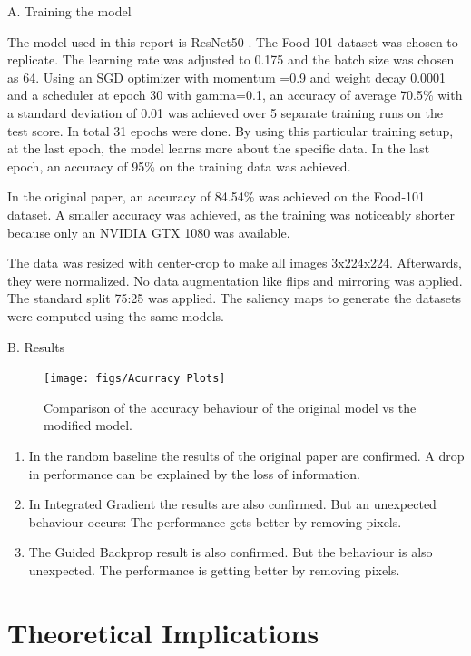 A. Training the model

The model used in this report is ResNet50 \cite{he2015deep}. The Food-101 \cite{bossard14} dataset was chosen to replicate. The learning rate was adjusted to 0.175 and the batch size was chosen as 64. Using an SGD optimizer with momentum =0.9 and weight decay 0.0001 and a scheduler at epoch 30 with gamma=0.1, an accuracy of average 70.5\% with a standard deviation of 0.01 was achieved over 5 separate training runs on the test score. In total 31 epochs were done. 
By using this particular training setup, at the last epoch, the model learns more about the specific data. In the last epoch, an accuracy of 95\% on the training data was achieved.

In the original paper, an accuracy of 84.54\% was achieved on the Food-101 dataset. A smaller accuracy was achieved, as the training was noticeably shorter because only an NVIDIA GTX 1080 was available.

The data was resized with center-crop to make all images 3x224x224. Afterwards, they were normalized. No data augmentation like flips and mirroring was applied. The standard split 75:25 was applied. The saliency maps to generate the datasets were computed using the same models.

B. Results

\begin{figure}[h!]
	\centering
	\texttt{[image: figs/Acurracy Plots]}
	\caption {Comparison of the accuracy behaviour of the original model vs the modified model.}
	\label{fig:Sanity}
\end{figure}

\begin{enumerate}
	\item In the random baseline the results of the original paper are confirmed. A drop in performance can be explained by the loss of information.
	\item In Integrated Gradient the results are also confirmed. But an unexpected behaviour occurs: The performance gets better by removing pixels. 
	\item The Guided Backprop result is also confirmed. But the behaviour is also unexpected. The performance is getting better by removing pixels.
\end{enumerate}



\section{Theoretical Implications}


